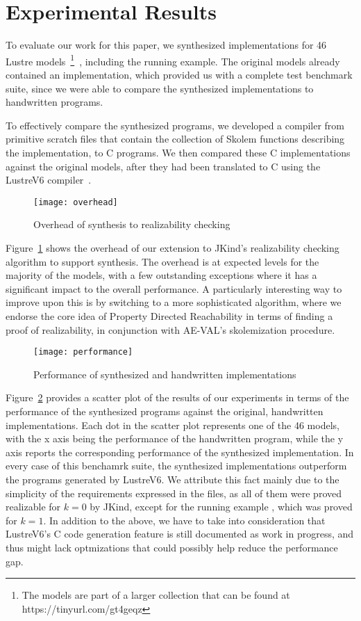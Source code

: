 \section{Experimental Results}
To evaluate our work for this paper, we synthesized implementations for 46
Lustre models~\footnote{The models are part of a larger collection
that can be found at
https://tinyurl.com/gt4geqz}~\cite{Hagen08:FMCAD}, including the running example. The original models already contained an implementation,
which provided us with a complete test benchmark suite, since we were able to
compare the synthesized implementations to handwritten programs.

To effectively compare the synthesized programs, we developed a compiler from
primitive scratch files that contain the collection of Skolem functions
describing the implementation, to C programs. We then compared these C
implementations against the original models, after they had been translated
to C using the LustreV6 compiler~\cite{lustrev6}.

\begin{figure}[]
	\centering
	\texttt{[image: overhead]}    	
	\caption{Overhead of synthesis to realizability checking}
	\label{fg:overhead}
\end{figure}

Figure~\ref{fg:overhead} shows the overhead of our extension to JKind's
realizability checking algorithm to support synthesis. The overhead is at
expected levels for the majority of the models, with a few outstanding
exceptions where it has a significant impact to the overall performance.
A particularly interesting way to improve upon this is by switching to a more
sophisticated algorithm, where we endorse the core idea of Property Directed
Reachability in terms of finding a proof of realizability, in conjunction with
AE-VAL's skolemization procedure.

\begin{figure}[H]
	\centering
	\texttt{[image: performance]}    	
	\caption{Performance of synthesized and handwritten implementations}
	\label{fg:performance}
\end{figure}

Figure~\ref{fg:performance} provides a scatter plot of the results of our
experiments in terms of the performance of the synthesized programs against the original, handwritten
implementations. Each dot in the scatter plot represents one of the 46
models, with the x axis being the performance of the handwritten
program, while the y axis reports the corresponding performance of the
synthesized implementation. In every case of this benchamrk suite, the
synthesized implementations outperform the programs generated by LustreV6.
We attribute this fact mainly due to the simplicity of the requirements expressed in the files,
as all of them were proved realizable for $k=0$ by JKind, except for the running
example , which was proved for $k=1$.
In addition to the above, we have to take into consideration that LustreV6's C
code generation feature is still documented as work in progress, and thus might
lack optmizations that could possibly help reduce the performance gap.


